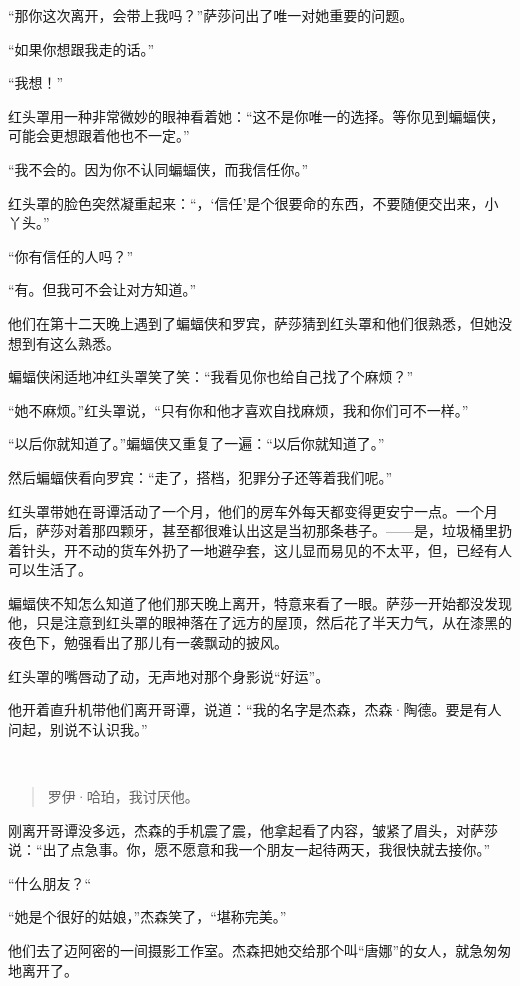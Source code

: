\documentclass[../main]{subfiles}
\begin{document}
“那你这次离开，会带上我吗？”萨莎问出了唯一对她重要的问题。

“如果你想跟我走的话。”

“我想！”

红头罩用一种非常微妙的眼神看着她：“这不是你唯一的选择。等你见到蝙蝠侠，可能会更想跟着他也不一定。”

“我不会的。因为你不认同蝙蝠侠，而我信任你。”

红头罩的脸色突然凝重起来：“，‘信任’是个很要命的东西，不要随便交出来，小丫头。”

“你有信任的人吗？”

“有。但我可不会让对方知道。”

他们在第十二天晚上遇到了蝙蝠侠和罗宾，萨莎猜到红头罩和他们很熟悉，但她没想到有这么熟悉。

蝙蝠侠闲适地冲红头罩笑了笑：“我看见你也给自己找了个麻烦？”

“她不麻烦。”红头罩说，“只有你和他才喜欢自找麻烦，我和你们可不一样。”

“以后你就知道了。”蝙蝠侠又重复了一遍：“以后你就知道了。”

然后蝙蝠侠看向罗宾：“走了，搭档，犯罪分子还等着我们呢。”

红头罩带她在哥谭活动了一个月，他们的房车外每天都变得更安宁一点。一个月后，萨莎对着那四颗牙，甚至都很难认出这是当初那条巷子。——是，垃圾桶里扔着针头，开不动的货车外扔了一地避孕套，这儿显而易见的不太平，但，已经有人可以生活了。

蝙蝠侠不知怎么知道了他们那天晚上离开，特意来看了一眼。萨莎一开始都没发现他，只是注意到红头罩的眼神落在了远方的屋顶，然后花了半天力气，从在漆黑的夜色下，勉强看出了那儿有一袭飘动的披风。

红头罩的嘴唇动了动，无声地对那个身影说“好运”。

他开着直升机带他们离开哥谭，说道：“我的名字是杰森，杰森·陶德。要是有人问起，别说不认识我。”

~\

\begin{quote}
    罗伊·哈珀，我讨厌他。
\end{quote}

刚离开哥谭没多远，杰森的手机震了震，他拿起看了内容，皱紧了眉头，对萨莎说：“出了点急事。你，愿不愿意和我一个朋友一起待两天，我很快就去接你。”

“什么朋友？“

“她是个很好的姑娘，”杰森笑了，“堪称完美。”

他们去了迈阿密的一间摄影工作室。杰森把她交给那个叫“唐娜”的女人，就急匆匆地离开了。
\end{document}
